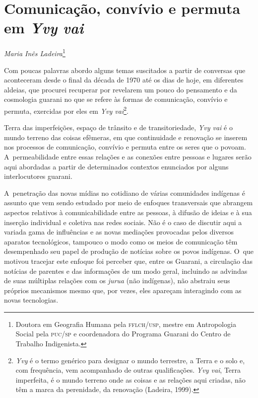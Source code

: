 \thispagestyle{empty}

\chapter*{Comunicação, convívio e permuta em \emph{Yvy vai}}


\begin{flushright}
\emph{Maria Inês Ladeira}\footnote{Doutora em Geografia Humana pela
\textsc{fflch}/\textsc{usp}, mestre em Antropologia Social pela \textsc{puc}/\textsc{sp} e coordenadora do
Programa Guarani do Centro de Trabalho Indigenista.}
\end{flushright}

\noindent Com poucas palavras abordo alguns temas suscitados a partir de conversas
que aconteceram desde o final da década de 1970 até os dias de hoje, em
diferentes aldeias, que procurei recuperar por revelarem um pouco do
pensamento e da cosmologia guarani no que se refere às formas de
comunicação, convívio e permuta, exercidas por eles em \emph{Yvy
vai}\footnote{\emph{Yvy} é o termo genérico para designar o mundo terrestre, a
Terra e o solo e, com frequência, vem acompanhado de outras
qualificações. \emph{Yvy vai}, Terra imperfeita, é o mundo terreno onde as
coisas e as relações aqui criadas, não têm a marca da perenidade, da
renovação (Ladeira, 1999).}. 

Terra das imperfeições, espaço de trânsito e de transitoriedade, \emph{Yvy vai}
é o mundo terreno das coisas efêmeras, em que continuidade e renovação
se inserem nos processos de comunicação, convívio e permuta entre os
seres que o povoam. A~permeabilidade entre essas relações e as conexões
entre pessoas e lugares serão aqui abordadas a partir de determinados
contextos enunciados por alguns interlocutores guarani. 

A~penetração das novas mídias no cotidiano de várias comunidades
indígenas é assunto que vem sendo estudado por meio de enfoques
transversais que abrangem aspectos relativos à comunicabilidade entre
as pessoas, à difusão de ideias e à sua inserção individual e coletiva
nas redes sociais. Não é o caso de discutir aqui a variada gama de
influências e as novas mediações provocadas pelos diversos aparatos
tecnológicos, tampouco o modo como os meios de comunicação têm
desempenhado seu papel de produção de notícias sobre os povos
indígenas. O~que motivou tracejar este enfoque foi perceber que, entre
os Guarani, a circulação das notícias de parentes e das informações de
um modo geral, incluindo as advindas de suas múltiplas relações com os
\emph{jurua} (não indígenas), não abstraiu seus próprios mecanismos mesmo que,
por vezes, eles apareçam interagindo com as novas tecnologias.

